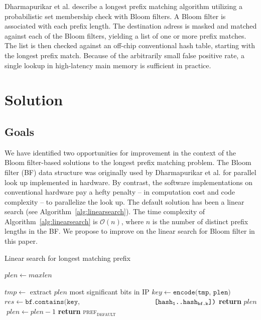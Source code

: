 \documentclass[conference,compsoc]{IEEEtran}
\begin{document}
Dharmapurikar et al.\cite{Dharmapurikar:Bloom} describe a longest prefix
matching algorithm utilizing a probabilistic set membership check with
Bloom filters. A Bloom filter is associated with each prefix length. The
destination adress is masked and matched against each of the Bloom filters,
yielding a list of one or more prefix matches. The list is then checked
against an off-chip conventional hash table, starting with the longest 
prefix match. Because of the arbitrarily small false positive rate, 
a single lookup in high-latency main memory is sufficient in practice.

\section{Solution}

\subsection{Goals}

We have identified two opportunities for improvement in the context of
the Bloom filter-based solutions to the longest prefix matching problem.
The Bloom filter (BF) data structure was originally used by 
Dharmapurikar et al. \cite{Dharmapurikar:Bloom}
for parallel look up implemented in hardware. By contrast, the software
implementations on conventional hardware pay a hefty penalty -- in computation
cost and code complexity -- to parallelize the look up. The default solution
has been a linear search (see Algorithm~\ref{alg:linearsearch}). The time
complexity of Algorithm~\ref{alg:linearsearch} is $\mathcal{O}(n)$, where $n$
is the number of distinct prefix lengths in the BF. We
propose to improve on the linear search for Bloom filter in this paper.

\begin{algorithm}
\caption{Linear search for longest matching prefix}\label{alg:linearsearch}
\begin{algorithmic}[1]
\State $plen \gets maxlen$

  \State $tmp \gets$ extract $plen$ most significant bits in IP
  \State $key \gets \texttt{encode(tmp, plen)}$
  \State $res \gets \texttt{bf.contains(key,}$
                \State $\hspace*{36mm} \texttt{[hash\textsubscript{1}..hash\textsubscript{bf.k}])}$
      \State \textbf{return} $plen$
  \Else
    $\;plen \gets plen - 1$
  \EndIf
\EndWhile
\State \textbf{return} \textsc{pref\textsubscript{default}}
\EndProcedure
\end{algorithmic}
\end{algorithm}
\end{document}

